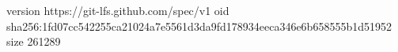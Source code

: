 version https://git-lfs.github.com/spec/v1
oid sha256:1fd07cc542255ca21024a7e5561d3da9fd178934eeca346e6b658555b1d51952
size 261289
